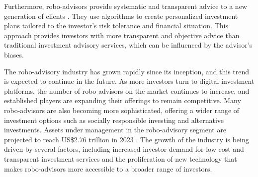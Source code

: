 Furthermore, robo-advisors provide systematic and transparent advice to a new generation of clients \cite{alsabah2021robo,beketov2018robo}. They use algorithms to create personalized investment plans tailored to the investor's risk tolerance and financial situation. This approach provides investors with more transparent and objective advice than traditional investment advisory services, which can be influenced by the advisor's biases.

The robo-advisory industry has grown rapidly since its inception, and this trend is expected to continue in the future. As more investors turn to digital investment platforms, the number of robo-advisors on the market continues to increase, and established players are expanding their offerings to remain competitive. Many robo-advisors are also becoming more sophisticated, offering a wider range of investment options such as socially responsible investing and alternative investments. Assets under management in the robo-advisory segment are projected to reach US\$2.76 trillion in 2023 \cite{statista2023}. The growth of the industry is being driven by several factors, including increased investor demand for low-cost and transparent investment services and the proliferation of new technology that makes robo-advisors more accessible to a broader range of investors. 


